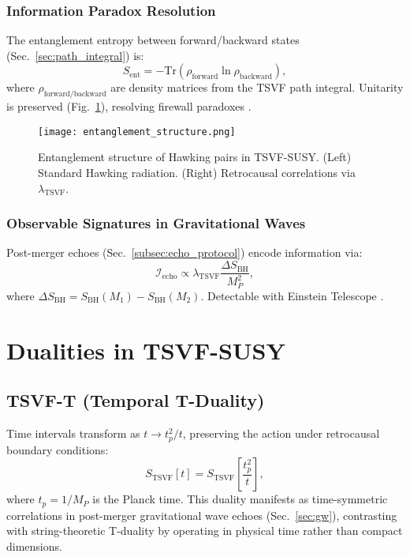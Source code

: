 \documentclass[twocolumn,superscriptaddress,floatfix]{revtex4-2}
\newcommand{\tsvf}{\lambda_{\text{TSVF}}}
\begin{document}
\subsubsection{Information Paradox Resolution}  
The entanglement entropy between forward/backward states (Sec.~\ref{sec:path_integral}) is:  
\begin{equation}  
S_{\text{ent}} = - \text{Tr}\left(\rho_{\text{forward}} \ln \rho_{\text{backward}}\right),  
\label{eq:entanglement_entropy}  
\end{equation}  
where \(\rho_{\text{forward/backward}}\) are density matrices from the TSVF path integral. Unitarity is preserved (Fig.~\ref{fig:entanglement}), resolving firewall paradoxes \cite{Almheiri2013}.  

\begin{figure}[htbp]  
\centering  
\texttt{[image: entanglement\_structure.png]}  
\caption{Entanglement structure of Hawking pairs in TSVF-SUSY. (Left) Standard Hawking radiation. (Right) Retrocausal correlations via \(\tsvf\).}  
\label{fig:entanglement}  
\end{figure}  

\subsubsection{Observable Signatures in Gravitational Waves}  
Post-merger echoes (Sec.~\ref{subsec:echo_protocol}) encode information via:  
\begin{equation}  
\mathcal{I}_{\text{echo}} \propto \tsvf \frac{\Delta S_{\text{BH}}}{M_P^2},  
\label{eq:info_echo}  
\end{equation}  
where \(\Delta S_{\text{BH}} = S_{\text{BH}}(M_1) - S_{\text{BH}}(M_2)\). Detectable with Einstein Telescope \cite{Punturo2010}.  

\section{Dualities in TSVF-SUSY}  
\label{sec:dualities}  

\subsection{TSVF-T (Temporal T-Duality)}  
\label{subsec:t_duality}  

Time intervals transform as \( t \to t_p^2 / t \), preserving the action under retrocausal boundary conditions:  
\begin{equation}  
S_{\text{TSVF}}[t] = S_{\text{TSVF}}\!\left[\frac{t_p^2}{t}\right],  
\label{eq:t_duality}  
\end{equation}  
where \( t_p = 1/M_P \) is the Planck time. This duality manifests as time-symmetric correlations in post-merger gravitational wave echoes (Sec.~\ref{sec:gw}), contrasting with string-theoretic T-duality \cite{Polchinski1998} by operating in physical time rather than compact dimensions.  
\end{document}
